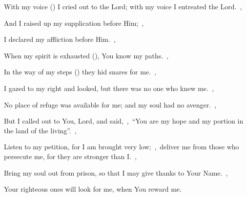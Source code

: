 \documentclass[12pt,twoside,a5paper]{article}
\begin{document}
\begin{normalparskip}
  With my voice () I cried out to the Lord; with my voice I entreated the Lord.~\sep

  And I raised up my supplication before Him;~\sep


  I declared my affliction before Him.~\sep

  When my spirit is exhausted (), You know my paths.~\sep

  In the way of my steps () they hid snares for me.~\sep

  I gazed to my right and looked, but there was no one who knew me.~\sep

  No place of refuge was available for me; and my soul had no avenger.~\sep

  But I called out to You, Lord, and said,~\sep\ ``You are my hope and my portion in the land of the living''.~\sep

  Listen to my petition, for I am brought very low;~\sep\ deliver me from those who persecute me, for they are stronger than I.~\sep

  Bring my soul out from prison, so that I may give thanks to Your Name.~\sep

  Your righteous ones will look for me, when You reward me.
\end{normalparskip}

\end{document}
